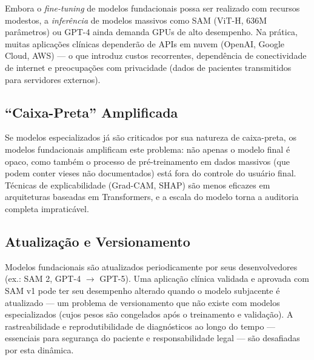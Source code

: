 Embora o \textit{fine-tuning} de modelos fundacionais possa ser realizado com recursos modestos, a \textit{inferência} de modelos massivos como SAM (ViT-H, 636M parâmetros) ou GPT-4 ainda demanda GPUs de alto desempenho. Na prática, muitas aplicações clínicas dependerão de APIs em nuvem (OpenAI, Google Cloud, AWS) --- o que introduz custos recorrentes, dependência de conectividade de internet e preocupações com privacidade (dados de pacientes transmitidos para servidores externos).

\subsection{``Caixa-Preta'' Amplificada}

Se modelos especializados já são criticados por sua natureza de caixa-preta, os modelos fundacionais amplificam este problema: não apenas o modelo final é opaco, como também o processo de pré-treinamento em dados massivos (que podem conter vieses não documentados) está fora do controle do usuário final. Técnicas de explicabilidade (Grad-CAM, SHAP) são menos eficazes em arquiteturas baseadas em Transformers, e a escala do modelo torna a auditoria completa impraticável.

\subsection{Atualização e Versionamento}

Modelos fundacionais são atualizados periodicamente por seus desenvolvedores (ex.: SAM 2, GPT-4 $\rightarrow$ GPT-5). Uma aplicação clínica validada e aprovada com SAM v1 pode ter seu desempenho alterado quando o modelo subjacente é atualizado --- um problema de versionamento que não existe com modelos especializados (cujos pesos são congelados após o treinamento e validação). A rastreabilidade e reprodutibilidade de diagnósticos ao longo do tempo --- essenciais para segurança do paciente e responsabilidade legal --- são desafiadas por esta dinâmica.


